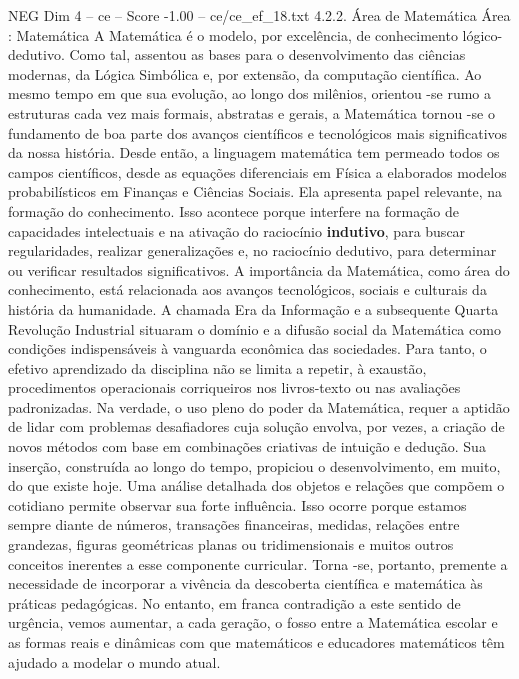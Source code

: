 \begin{textsample}{NEG Dim 4 – ce – Score -1.00 – ce/ce\_ef\_18.txt}  \label{ex:f4_neg_156}
4.2.2.
Área de Matemática Área : Matemática A Matemática é o modelo, por excelência, de conhecimento lógico-dedutivo.
Como tal, assentou as bases para o desenvolvimento das ciências modernas, da Lógica Simbólica e, por extensão, da computação científica.
Ao mesmo tempo em que sua evolução, ao longo dos milênios, orientou -se rumo a estruturas cada vez mais formais, abstratas e gerais, a Matemática tornou -se o fundamento de boa parte dos avanços científicos e tecnológicos mais significativos da nossa história.
Desde então, a linguagem matemática tem permeado todos os campos científicos, desde as equações diferenciais em Física a elaborados modelos probabilísticos em Finanças e Ciências Sociais.
Ela apresenta papel relevante, na formação do conhecimento.
Isso acontece porque interfere na formação de capacidades intelectuais e na ativação do raciocínio \textbf{indutivo}, para buscar regularidades, realizar generalizações e, no raciocínio dedutivo, para determinar ou verificar resultados significativos.
A importância da Matemática, como área do conhecimento, está relacionada aos avanços tecnológicos, sociais e culturais da história da humanidade.
A chamada Era da Informação e a subsequente Quarta Revolução Industrial situaram o domínio e a difusão social da Matemática como condições indispensáveis à vanguarda econômica das sociedades.
Para tanto, o efetivo aprendizado da disciplina não se limita a repetir, à exaustão, procedimentos operacionais corriqueiros nos livros-texto ou nas avaliações padronizadas.
Na verdade, o uso pleno do poder da Matemática, requer a aptidão de lidar com problemas desafiadores cuja solução envolva, por vezes, a criação de novos métodos com base em combinações criativas de intuição e dedução.
Sua inserção, construída ao longo do tempo, propiciou o desenvolvimento, em muito, do que existe hoje.
Uma análise detalhada dos objetos e relações que compõem o cotidiano permite observar sua forte influência.
Isso ocorre porque estamos sempre diante de números, transações financeiras, medidas, relações entre grandezas, figuras geométricas planas ou tridimensionais e muitos outros conceitos inerentes a esse componente curricular.
Torna -se, portanto, premente a necessidade de incorporar a vivência da descoberta científica e matemática às práticas pedagógicas.
No entanto, em franca contradição a este sentido de urgência, vemos aumentar, a cada geração, o fosso entre a Matemática escolar e as formas reais e dinâmicas com que matemáticos e educadores matemáticos têm ajudado a modelar o mundo atual.

\end{textsample}
